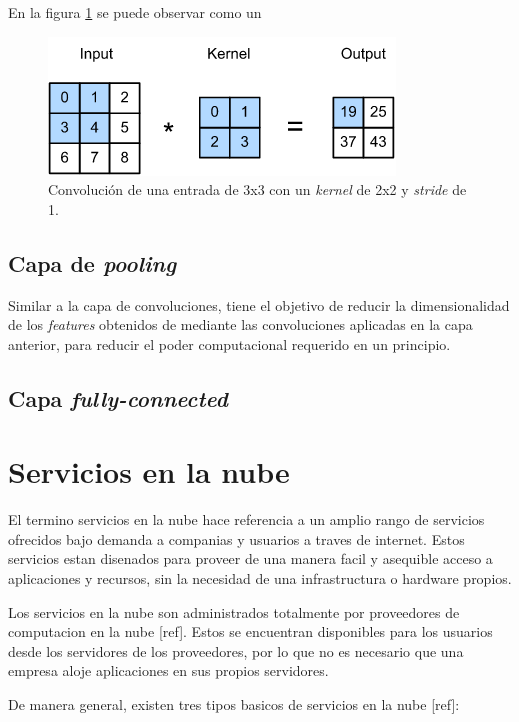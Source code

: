 En la figura \ref{fig:cnn_conv} se puede observar como un 

\begin{figure}[h]
	\centering
	\includegraphics[scale=0.7]{./Figures/cnn_conv.png}
	\caption{Convolución de una entrada de 3x3 con un \textit{kernel} de 2x2 y \textit{stride} de 1.}
	\label{fig:cnn_conv}
\end{figure}

\subsection{Capa de \textit{pooling}}
Similar a la capa de convoluciones, tiene el objetivo de reducir la dimensionalidad de los \textit{features} obtenidos de mediante las convoluciones aplicadas en la capa anterior, para reducir el poder computacional requerido en un principio.



\subsection{Capa \textit{fully-connected}}

\section{Servicios en la nube}
El termino servicios en la nube hace referencia a un amplio rango de servicios ofrecidos bajo demanda a companias y usuarios a traves de internet. Estos servicios estan disenados para proveer de una manera facil y asequible acceso a aplicaciones y recursos, sin la necesidad de una infrastructura o hardware propios.

Los servicios en la nube son administrados totalmente por proveedores de computacion en la nube [ref]. Estos se encuentran disponibles para los usuarios desde los servidores de los proveedores, por lo que no es necesario que una empresa aloje aplicaciones en sus propios servidores.

De manera general, existen tres tipos basicos de servicios en la nube [ref]:

